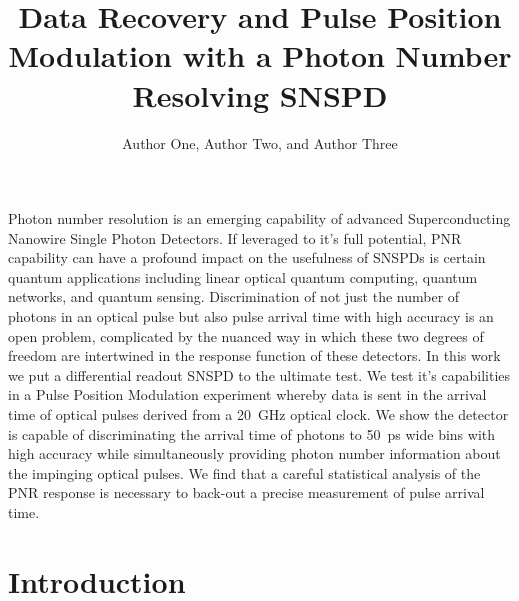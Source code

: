 \documentclass{optica-article}
\begin{document}
\title{Data Recovery and Pulse Position Modulation with a Photon Number Resolving SNSPD}

\author{Author One, Author Two, and Author Three}

\address{Peer Review, Publications Department, Optica Publishing Group, 2010 Massachusetts Avenue NW, Washington, DC 20036, USA\\
Publications Department, Optica Publishing Group, 2010 Massachusetts Avenue NW, Washington, DC 20036, USA\\
Currently with the Department of Electronic Journals, Optica Publishing Group, 2010 Massachusetts Avenue NW, Washington, DC 20036, USA}



\begin{abstract*} 
Photon number resolution is an emerging capability of advanced Superconducting Nanowire Single Photon Detectors. If leveraged to it's full potential, PNR capability can have a profound impact on the usefulness of SNSPDs is certain quantum applications including linear optical quantum computing, quantum networks, and quantum sensing. Discrimination of not just the number of photons in an optical pulse but also pulse arrival time with high accuracy is an open problem, complicated by the nuanced way in which these two degrees of freedom are intertwined in the response function of these detectors. In this work we put a differential readout SNSPD to the ultimate test. We test it's capabilities in a Pulse Position Modulation experiment whereby data is sent in the arrival time of optical pulses derived from a 20~GHz optical clock. We show the detector is capable of discriminating the arrival time of photons to 50~ps wide bins with high accuracy while simultaneously providing photon number information about the impinging optical pulses. We find that a careful statistical analysis of the PNR response is necessary to back-out a precise measurement of pulse arrival time.
\end{abstract*}

\hypertarget{introduction}{%
\section{Introduction}\label{introduction}}
\end{document}
